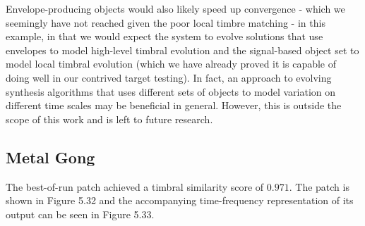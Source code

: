 \documentclass[12pt]{report} 	%
\numberwithin{figure}{chapter}
\numberwithin{table}{chapter}
\numberwithin{equation}{chapter}
\begin{document}
\begin{flushleft}
Envelope-producing objects would also likely speed up convergence - which we seemingly have not reached given the poor local timbre matching - in this example, in that we would expect the system to evolve solutions that use envelopes to model high-level timbral evolution and the signal-based object set to model local timbral evolution (which we have already proved it is capable of doing well in our contrived target testing). In fact, an approach to evolving synthesis algorithms that uses different sets of objects to model variation on different time scales may be beneficial in general. However, this is outside the scope of this work and is left to future research.

\clearpage
\subsection{Metal Gong}

The best-of-run patch achieved a timbral similarity score of $0.971$. The patch is shown in Figure 5.32 and the accompanying time-frequency representation of its output can be seen in Figure 5.33.


\end{flushleft}
\end{document}
